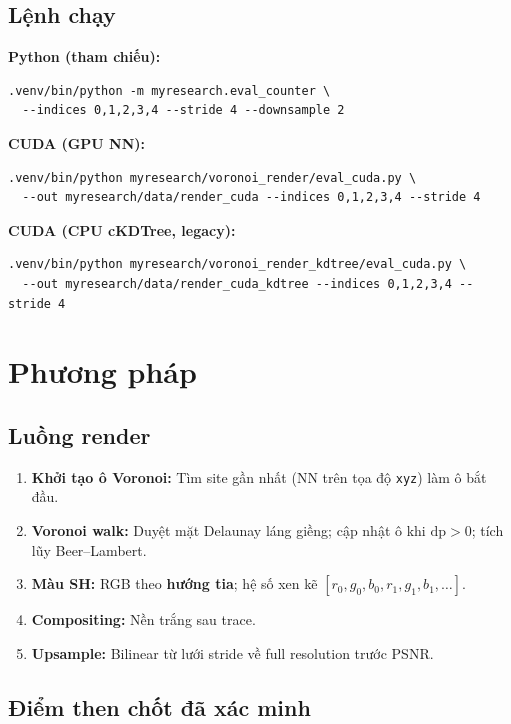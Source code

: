 \documentclass[11pt,a4paper]{article}
\begin{document}
\subsection{Lệnh chạy}

\textbf{Python (tham chiếu):}
\begin{lstlisting}
.venv/bin/python -m myresearch.eval_counter \
  --indices 0,1,2,3,4 --stride 4 --downsample 2
\end{lstlisting}

\textbf{CUDA (GPU NN):}
\begin{lstlisting}
.venv/bin/python myresearch/voronoi_render/eval_cuda.py \
  --out myresearch/data/render_cuda --indices 0,1,2,3,4 --stride 4
\end{lstlisting}

\textbf{CUDA (CPU cKDTree, legacy):}
\begin{lstlisting}
.venv/bin/python myresearch/voronoi_render_kdtree/eval_cuda.py \
  --out myresearch/data/render_cuda_kdtree --indices 0,1,2,3,4 --stride 4
\end{lstlisting}

\section{Phương pháp}

\subsection{Luồng render}

\begin{enumerate}[noitemsep]
    \item \textbf{Khởi tạo ô Voronoi:} Tìm site gần nhất (NN trên tọa độ \texttt{xyz}) làm ô bắt đầu.
    \item \textbf{Voronoi walk:} Duyệt mặt Delaunay láng giềng; cập nhật ô khi $\mathrm{dp} > 0$; tích lũy Beer--Lambert.
    \item \textbf{Màu SH:} RGB theo \textbf{hướng tia}; hệ số xen kẽ $[r_0,g_0,b_0, r_1,g_1,b_1, \ldots]$.
    \item \textbf{Compositing:} Nền trắng sau trace.
    \item \textbf{Upsample:} Bilinear từ lưới stride về full resolution trước PSNR.
\end{enumerate}

\subsection{Điểm then chốt đã xác minh}
\end{document}
